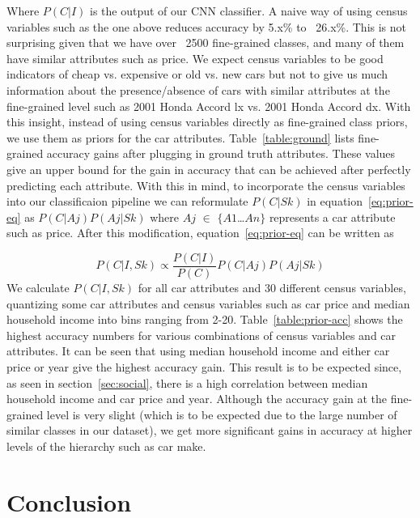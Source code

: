 \documentclass[10pt,twocolumn,letterpaper]{article}
\begin{document}
Where \(P(C|I)\) is the output of our CNN classifier. A naive way of using census variables such as the one above reduces accuracy by 5.x\% to ~26.x\%. This is not surprising given that we have over ~2500 fine-grained classes, and many of them have similar attributes such as price. We expect census variables to be good indicators of cheap vs. expensive or old vs. new cars but not to give us much information about the presence/absence of cars with similar attributes at the fine-grained level such as 2001 Honda Accord lx vs. 2001 Honda Accord dx. With this insight, instead of using census variables directly as fine-grained class priors, we use them as priors for the car attributes. Table~\ref{table:ground} lists fine-grained accuracy gains after plugging in ground truth attributes. These values give an upper bound for the gain in accuracy that can be achieved after perfectly predicting each attribute. With this in mind, to incorporate the census variables into our classificaion pipeline we can reformulate \(P(C|Sk)\) in equation~\ref{eq:prior-eq} as \(P(C|Aj)\)\(P(Aj|Sk)\) where \(Aj\) \(\in\) \(\{\)\(A1\)\ldots\(An\)\(\}\) represents a car attribute such as price. After this modification, equation~\ref{eq:prior-eq} can be written as  

\begin{equation}
  P(C|I,Sk) \propto \frac{P(C|I)}{P(C)}P(C|Aj)P(Aj|Sk)
\end{equation}
We calculate \(P(C|I,Sk)\) for all car attributes and 30 different census variables, quantizing some car attributes and census variables such as car price and median household income into bins ranging from 2-20. Table~\ref{table:prior-acc} shows the highest accuracy numbers for various combinations of census variables and car attributes. It can be seen that using median household income and either car price or year give the highest accuracy gain. This result is to be expected since, as seen in section~\ref{sec:social}, there is a high correlation between median household income and car price and year. Although the accuracy gain at the fine-grained level is very slight (which is to be expected due to the large number of similar classes in our dataset), we get more significant gains in accuracy at higher levels of the hierarchy such as car make. 

\section{Conclusion}
{\small


}
\end{document}
